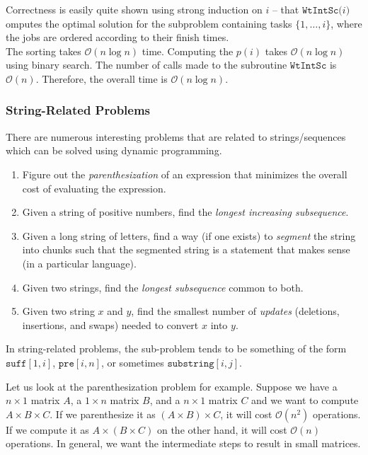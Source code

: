 Correctness is easily quite shown using strong induction on $i$ -- that $\texttt{WtIntSc($i$)}$ omputes the optimal solution for the subproblem containing tasks $\{1,\ldots,i\}$, where the jobs are ordered according to their finish times.\\

The sorting takes $\mathcal{O}(n\log n)$ time. Computing the $p(i)$ takes $\mathcal{O}(n\log n)$ using binary search. The number of calls made to the subroutine $\texttt{WtIntSc}$ is $\mathcal{O}(n)$. Therefore, the overall time is $\mathcal{O}(n\log n)$.

\subsubsection{String-Related Problems}

There are numerous interesting problems that are related to strings/sequences which can be solved using dynamic programming.
\begin{enumerate}
	\item Figure out the \textit{parenthesization} of an expression that minimizes the overall cost of evaluating the expression.
	\item Given a string of positive numbers, find the \textit{longest increasing subsequence}.
	\item Given a long string of letters, find a way (if one exists) to \textit{segment} the string into chunks such that the segmented string is a statement that makes sense (in a particular language).
	\item Given two strings, find the \textit{longest subsequence} common to both.
	\item Given two string $x$ and $y$, find the smallest number of \textit{updates} (deletions, insertions, and swaps) needed to convert $x$ into $y$.
\end{enumerate}

In string-related problems, the sub-problem tends to be something of the form $\texttt{suff}[1,i]$, $\texttt{pre}[i,n]$, or sometimes $\texttt{substring}[i,j]$.

Let us look at the parenthesization problem for example. Suppose we have a $n\times 1$ matrix $A$, a $1\times n$ matrix $B$, and a $n\times 1$ matrix $C$ and we want to compute $A\times B\times C$. If we parenthesize it as $(A\times B)\times C$, it will cost $\mathcal{O}(n^2)$ operations. If we compute it as $A\times (B\times C)$ on the other hand, it will cost $\mathcal{O}(n)$ operations. In general, we want the intermediate steps to result in small matrices.

